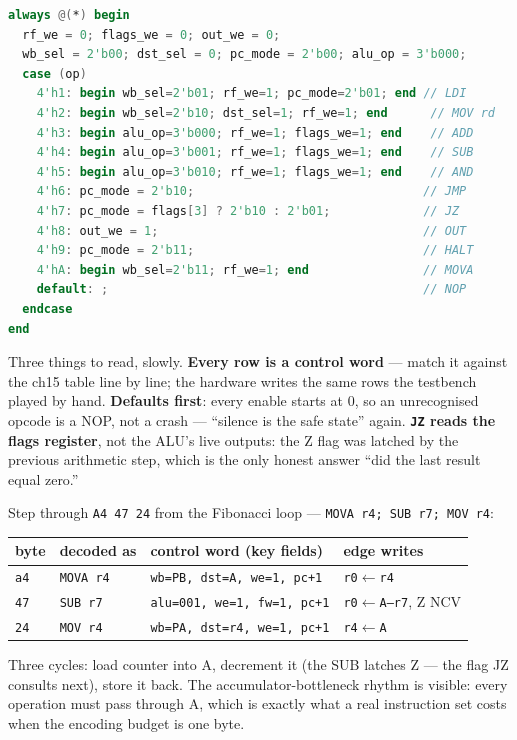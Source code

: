 \begin{lstlisting}[language=Verilog, caption={The decoder: instruction
opcode in, 11-bit control word out --- combinational, so the whole
instruction completes on the next edge. From \ttfamily
code/ch16\_cpu8.v.}, label={lst:decoder16}]
always @(*) begin
  rf_we = 0; flags_we = 0; out_we = 0;
  wb_sel = 2'b00; dst_sel = 0; pc_mode = 2'b00; alu_op = 3'b000;
  case (op)
    4'h1: begin wb_sel=2'b01; rf_we=1; pc_mode=2'b01; end // LDI
    4'h2: begin wb_sel=2'b10; dst_sel=1; rf_we=1; end      // MOV rd
    4'h3: begin alu_op=3'b000; rf_we=1; flags_we=1; end    // ADD
    4'h4: begin alu_op=3'b001; rf_we=1; flags_we=1; end    // SUB
    4'h5: begin alu_op=3'b010; rf_we=1; flags_we=1; end    // AND
    4'h6: pc_mode = 2'b10;                                // JMP
    4'h7: pc_mode = flags[3] ? 2'b10 : 2'b01;             // JZ
    4'h8: out_we = 1;                                     // OUT
    4'h9: pc_mode = 2'b11;                                // HALT
    4'hA: begin wb_sel=2'b11; rf_we=1; end                // MOVA
    default: ;                                            // NOP
  endcase
end
\end{lstlisting}

Three things to read, slowly. \textbf{Every row is a control word}
--- match it against the ch15 table line by line; the hardware writes
the same rows the testbench played by hand. \textbf{Defaults first}:
every enable starts at 0, so an unrecognised opcode is a NOP, not a
crash --- ``silence is the safe state'' again. \textbf{\texttt{JZ}
reads the flags register}, not the ALU's live outputs: the Z flag was
latched by the previous arithmetic step, which is the only honest
answer ``did the last result equal zero.''

\begin{example}
Step through \texttt{A4 47 24} from the Fibonacci loop ---
\texttt{MOVA r4; SUB r7; MOV r4}:

\begin{center}
\begin{tabular}{llll}
\toprule
byte & decoded as & control word (key fields) & edge writes\\
\midrule
\texttt{a4} & \texttt{MOVA r4} & \texttt{wb=PB, dst=A, we=1, pc+1} & \texttt{r0$\leftarrow$r4}\\
\texttt{47} & \texttt{SUB r7} & \texttt{alu=001, we=1, fw=1, pc+1} & \texttt{r0$\leftarrow$A--r7}, Z NCV\\
\texttt{24} & \texttt{MOV r4} & \texttt{wb=PA, dst=r4, we=1, pc+1} & \texttt{r4$\leftarrow$A}\\
\bottomrule
\end{tabular}
\end{center}

Three cycles: load counter into A, decrement it (the SUB latches Z
--- the flag JZ consults next), store it back. The
accumulator-bottleneck rhythm is visible: every operation must pass
through A, which is exactly what a real instruction set costs when
the encoding budget is one byte.
\end{example}

